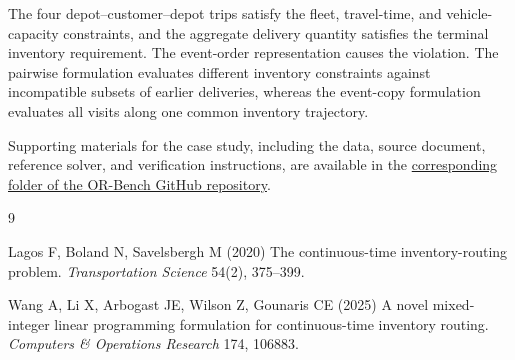\documentclass[10pt]{article}
\begin{document}
The four depot--customer--depot trips satisfy the fleet, travel-time, and vehicle-capacity constraints, and the aggregate delivery quantity satisfies the terminal inventory requirement. The event-order representation causes the violation. The pairwise formulation evaluates different inventory constraints against incompatible subsets of earlier deliveries, whereas the event-copy formulation evaluates all visits along one common inventory trajectory.

Supporting materials for the case study, including the data, source document, reference solver, and verification instructions, are available in the \href{https://github.com/Zhengzhong-You/OR-Bench/tree/main/problems/02_event_ordered_continuous_time_replenishment}{corresponding folder of the OR-Bench GitHub repository}.

\begin{thebibliography}{9}\small

Lagos F, Boland N, Savelsbergh M (2020)
The continuous-time inventory-routing problem.
\emph{Transportation Science} 54(2), 375--399.

Wang A, Li X, Arbogast JE, Wilson Z, Gounaris CE (2025)
A novel mixed-integer linear programming formulation for continuous-time inventory routing.
\emph{Computers \& Operations Research} 174, 106883.

\end{thebibliography}
\end{document}
